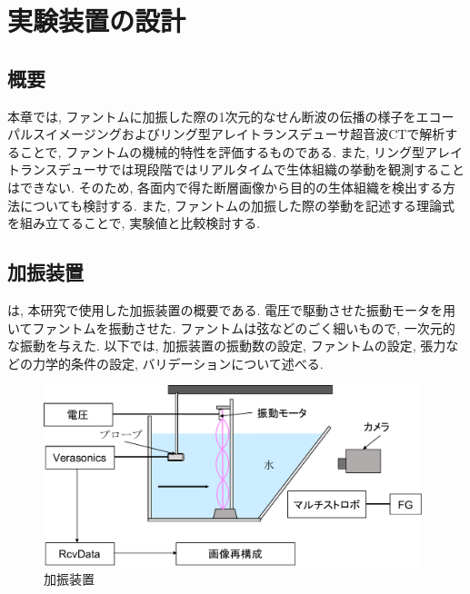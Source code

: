 \chapter{実験装置の設計}
\newpage
\section{概要}
本章では, ファントムに加振した際の1次元的なせん断波の伝播の様子をエコーパルスイメージングおよびリング型アレイトランスデューサ超音波CTで解析することで, ファントムの機械的特性を評価するものである. また, リング型アレイトランスデューサでは現段階ではリアルタイムで生体組織の挙動を観測することはできない. そのため, 各面内で得た断層画像から目的の生体組織を検出する方法についても検討する. また, ファントムの加振した際の挙動を記述する理論式を組み立てることで, 実験値と比較検討する.
\section{加振装置}
は, 本研究で使用した加振装置の概要である. 電圧で駆動させた振動モータを用いてファントムを振動させた. ファントムは弦などのごく細いもので, 一次元的な振動を与えた. 以下では, 加振装置の振動数の設定, ファントムの設定, 張力などの力学的条件の設定, バリデーションについて述べる. 
\begin{figure}[H]
  \begin{center}
    \includegraphics[width=110mm]{fig/jikkendevice.pdf}
  \end{center}
  \caption{加振装置}
\end{figure}
